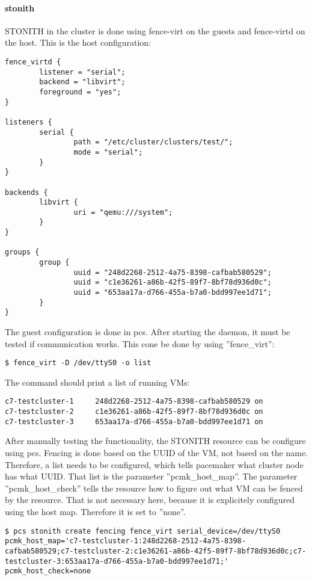 \paragraph{stonith}
\ac{STONITH} in the cluster is done using fence-virt on the guests and fence-virtd on
the host.
This is the host configuration:
\begin{lstlisting}
fence_virtd {
        listener = "serial";
        backend = "libvirt";
        foreground = "yes";
}

listeners {
        serial {
                path = "/etc/cluster/clusters/test/";
                mode = "serial";
        }
}

backends {
        libvirt { 
                uri = "qemu:///system";
        }
}

groups {
        group {
                uuid = "248d2268-2512-4a75-8398-cafbab580529";
                uuid = "c1e36261-a86b-42f5-89f7-8bf78d936d0c";
                uuid = "653aa17a-d766-455a-b7a0-bdd997ee1d71";
        }
}

\end{lstlisting}
The guest configuration is done in pcs. After starting the daemon, it must be tested
if communication works. This cone be done by using ''fence\_virt'':
\begin{lstlisting}
$ fence_virt -D /dev/ttyS0 -o list
\end{lstlisting}
The command should print a list of running \acp{VM}:
\begin{lstlisting}
c7-testcluster-1     248d2268-2512-4a75-8398-cafbab580529 on
c7-testcluster-2     c1e36261-a86b-42f5-89f7-8bf78d936d0c on
c7-testcluster-3     653aa17a-d766-455a-b7a0-bdd997ee1d71 on
\end{lstlisting}
After manually testing the functionality, the \ac{STONITH} resource can be configure
using pcs. Fencing is done based on the \ac{UUID} of the \ac{VM}, not based on the name.
Therefore, a list needs to be configured, which tells pacemaker what cluster node has what 
\ac{UUID}. That list is the parameter ''pcmk\_host\_map''. The parameter ''pcmk\_host\_check'' tells
the resource how to figure out what \acs{VM} can be fenced by the resource. That is not necessary here,
because it is explicitely configured using the host map. Therefore it is set to ''none''.
\begin{lstlisting}
$ pcs stonith create fencing fence_virt serial_device=/dev/ttyS0 pcmk_host_map='c7-testcluster-1:248d2268-2512-4a75-8398-cafbab580529;c7-testcluster-2:c1e36261-a86b-42f5-89f7-8bf78d936d0c;c7-testcluster-3:653aa17a-d766-455a-b7a0-bdd997ee1d71;' pcmk_host_check=none
\end{lstlisting}

